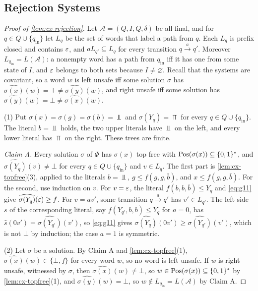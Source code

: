 \subsection{Rejection Systems}

\begin{proof}[Proof of \cref{lem:cx-rejection}]
Let $\mathcal A=(Q,I,Q,\delta)$ be all-final, and for
$q\in Q\cup\{q_{\mathrm{in}}\}$ let $L_q$ be the set of words that label a
path from $q$. Each $L_q$ is prefix closed and contains $\varepsilon$, and
$aL_{q'}\subseteq L_q$ for every transition $q\xrightarrow{a}q'$. Moreover
$L_{q_{\mathrm{in}}}=L(\mathcal A)$: a nonempty word has a path from
$q_{\mathrm{in}}$ iff it has one from some state of $I$, and $\varepsilon$ belongs
to both sets because $I\ne\varnothing$. Recall that the systems are
covariant, so a word $w$ is left unsafe iff some solution $\sigma$ has
$\widehat{\sigma(x)}(w)=\top\ne\widehat{\sigma(y)}(w)$, and right unsafe iff
some solution has $\widehat{\sigma(y)}(w)=\bot\ne\widehat{\sigma(x)}(w)$.

(1) Put $\sigma(x)=\sigma(g)=\sigma(b)=\Bot$ and $\sigma(Y_q)=\Top$ for every
$q\in Q\cup\{q_{\mathrm{in}}\}$. The literal $b=\Bot$ holds, the two upper
literals have $\Bot$ on the left, and every lower literal has $\Top$ on the
right. These trees are finite.

\emph{Claim A.} Every solution $\sigma$ of $\Phi$ has $\sigma(x)$ top free
with $\operatorname{Pos}(\sigma(x))\subseteq\{0,1\}^*$, and
$\widehat{\sigma(Y_q)}(v)\ne\bot$ for every $q\in Q\cup\{q_{\mathrm{in}}\}$ and
$v\in L_q$. The first part is \cref{lem:cx-topfree}(3), applied to the
literals $b=\Bot$, $g\le f(g,g,\bar b)$, and $x\le f(g,g,\bar b)$. For the
second, use induction on $v$. For $v=\varepsilon$, the literal
$f(b,b,\bar b)\le Y_q$ and \eqref{eq:g11} give
$\widehat{\sigma(Y_q)}(\varepsilon)\ge f$. For $v=av'$, some transition
$q\xrightarrow{a}q'$ has $v'\in L_{q'}$. The left side $s$ of the
corresponding literal, say $f(Y_{q'},b,\bar b)\le Y_q$ for $a=0$, has
$\widehat s(0v')=\widehat{\sigma(Y_{q'})}(v')$, so \eqref{eq:g11} gives
$\widehat{\sigma(Y_q)}(0v')\ge\widehat{\sigma(Y_{q'})}(v')$, which is not
$\bot$ by induction; the case $a=1$ is symmetric.

(2) Let $\sigma$ be a solution. By Claim A and \cref{lem:cx-topfree}(1),
$\widehat{\sigma(x)}(w)\in\{\bot,f\}$ for every word $w$, so no word is left
unsafe. If $w$ is right unsafe, witnessed by $\sigma$, then
$\widehat{\sigma(x)}(w)\ne\bot$, so $w\in\operatorname{Pos}(\sigma(x))\subseteq\{0,1\}^*$ by
\cref{lem:cx-topfree}(1), and $\widehat{\sigma(y)}(w)=\bot$, so
$w\notin L_{q_{\mathrm{in}}}=L(\mathcal A)$ by Claim A.


\end{proof}
